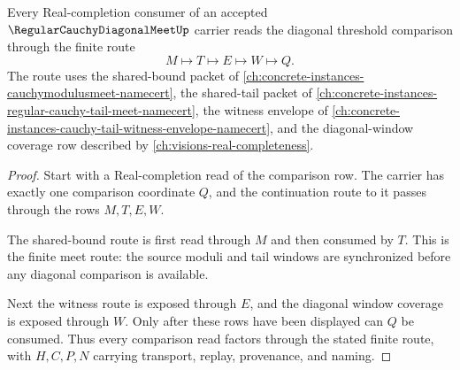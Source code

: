 \begin{theorem}
\label{thm:regular-cauchy-diagonal-meet-shared-threshold-factorization}
Every Real-completion consumer of an accepted $\RegularCauchyDiagonalMeetUp$ carrier reads the diagonal threshold comparison through the finite route
$$
M \longmapsto T \longmapsto E \longmapsto W \longmapsto Q.
$$
The route uses the shared-bound packet of \autoref{ch:concrete-instances-cauchymodulusmeet-namecert}, the shared-tail packet of \autoref{ch:concrete-instances-regular-cauchy-tail-meet-namecert}, the witness envelope of \autoref{ch:concrete-instances-cauchy-tail-witness-envelope-namecert}, and the diagonal-window coverage row described by \autoref{ch:visions-real-completeness}.
\end{theorem}
\begin{proof}
Start with a Real-completion read of the comparison row. The carrier has exactly one comparison coordinate $Q$, and the continuation route to it passes through the rows $M,T,E,W$.

The shared-bound route is first read through $M$ and then consumed by $T$. This is the finite meet route: the source moduli and tail windows are synchronized before any diagonal comparison is available.

Next the witness route is exposed through $E$, and the diagonal window coverage is exposed through $W$. Only after these rows have been displayed can $Q$ be consumed. Thus every comparison read factors through the stated finite route, with $H,C,P,N$ carrying transport, replay, provenance, and naming.
\end{proof}

